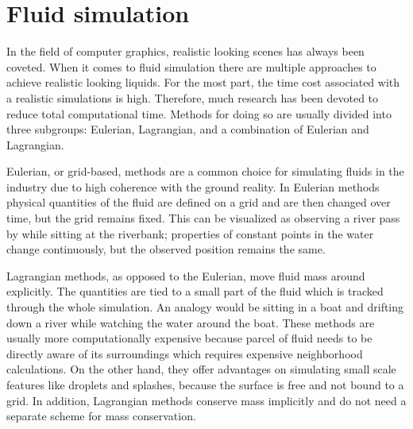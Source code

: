 \documentclass[../../main.tex]{subfiles}
\begin{document}
\tracingall


\section{Fluid simulation}
In the field of computer graphics, realistic looking scenes 
has always been coveted. When it comes to fluid simulation there are multiple approaches to achieve realistic looking liquids. For the most part, the time cost associated with a realistic simulations is high. Therefore, much research has been devoted to reduce total computational time. Methods for doing so are usually divided into three subgroups: Eulerian, Lagrangian, and a combination of Eulerian and Lagrangian.






Eulerian, or grid-based, methods are a common choice for simulating fluids in the industry due to high coherence with the ground reality. In Eulerian methods physical quantities of the fluid are defined on a grid and are then changed over time, but the grid remains fixed. This can be visualized as observing a river pass by while sitting at the riverbank; properties of constant points in the water change continuously, but the observed position remains the same. 

Lagrangian methods, as opposed to the Eulerian, move fluid mass around explicitly. The quantities are tied to a small part of the fluid which is tracked through the whole simulation. An analogy would be sitting in a boat and drifting down a river while watching the water around the boat. These methods are usually more computationally expensive because parcel of fluid needs to be directly aware of its surroundings which requires expensive neighborhood calculations. On the other hand, they offer advantages on simulating small scale features like droplets and splashes, because the surface is free and not bound to a grid. In addition, Lagrangian methods conserve mass implicitly and do not need a separate scheme for mass conservation. 
\end{document}
